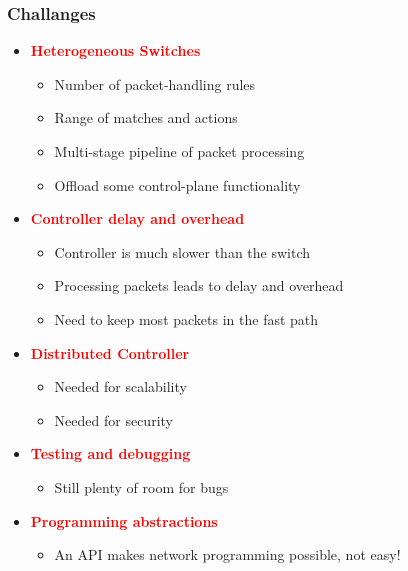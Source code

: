 \documentclass[a4paper, fontsize=8pt, landscape, DIV=1]{scrartcl}
\begin{document}
\begin{multicols*}{4}
		\subsubsection{Challanges}
		\begin{itemize}[noitemsep]
			\item \textcolor{Red}{\textbf{Heterogeneous Switches}}
			\begin{itemize}
				\item Number of packet-handling rules
				\item Range of matches and actions
				\item Multi-stage pipeline of packet processing
				\item Offload some control-plane functionality
			\end{itemize}
			\item \textcolor{Red}{\textbf{Controller delay and overhead}}
			\begin{itemize}
				\item Controller is much slower than the switch
				\item Processing packets leads to delay and overhead
				\item Need to keep most packets in the fast path
			\end{itemize}
			\item \textcolor{Red}{\textbf{Distributed Controller}}
			\begin{itemize}
				\item Needed for scalability
				\item Needed for security
			\end{itemize}
			\item \textcolor{Red}{\textbf{Testing and debugging}}
			\begin{itemize}
				\item Still plenty of room for bugs
			\end{itemize}
			\item \textcolor{Red}{\textbf{Programming abstractions}}
			\begin{itemize}
				\item An API makes network programming possible, not easy!
			\end{itemize}
			

\end{itemize}
\end{multicols*}
\end{document}
